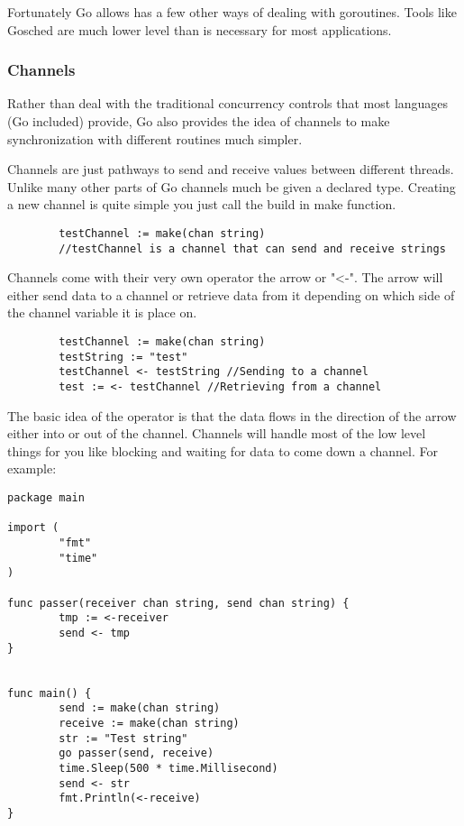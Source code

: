 \documentclass{acm_proc_article-sp}
\begin{document}
		Fortunately Go allows has a few other ways of dealing with goroutines. Tools like Gosched are much lower level than is necessary for most applications.
		
		\subsubsection{Channels}
		Rather than deal with the traditional concurrency controls that most languages (Go included) provide, Go also provides the idea of channels to make synchronization with different routines much simpler.
		
		Channels are just pathways to send and receive values between different threads. Unlike many other parts of Go channels much be given a declared type. Creating a new channel is quite simple you just call the build in make function.
		
		\begin{verbatim}
		testChannel := make(chan string)
		//testChannel is a channel that can send and receive strings
		\end{verbatim}
		
		Channels come with their very own operator the arrow or "<-". The arrow will either send data to a channel or retrieve data from it depending on which side of the channel variable it is place on.
		
		\begin{verbatim}
		testChannel := make(chan string)
		testString := "test"
		testChannel <- testString //Sending to a channel
		test := <- testChannel //Retrieving from a channel
		\end{verbatim}
		
		The basic idea of the operator is that the data flows in the direction of the arrow either into or out of the channel. Channels will handle most of the low level things for you like blocking and waiting for data to come down a channel. For example: 
		
		\begin{verbatim}
package main

import (
        "fmt"
        "time"
)

func passer(receiver chan string, send chan string) {
        tmp := <-receiver
        send <- tmp
}


func main() {
        send := make(chan string)
        receive := make(chan string)
        str := "Test string"
        go passer(send, receive)
        time.Sleep(500 * time.Millisecond)
        send <- str
        fmt.Println(<-receive)
}
		\end{verbatim}
		
\end{document}
